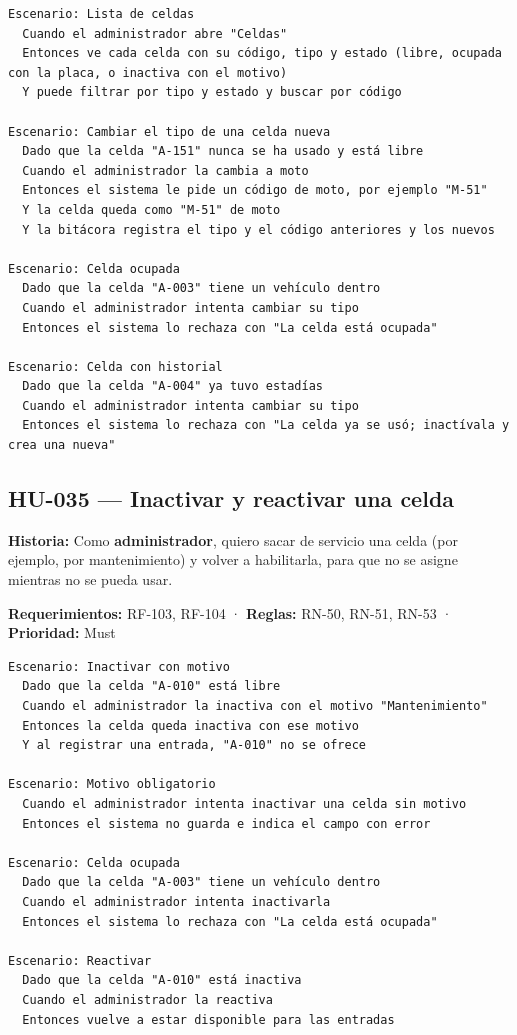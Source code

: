 \begin{lstlisting}[style=gherkin]
Escenario: Lista de celdas
  Cuando el administrador abre "Celdas"
  Entonces ve cada celda con su código, tipo y estado (libre, ocupada con la placa, o inactiva con el motivo)
  Y puede filtrar por tipo y estado y buscar por código

Escenario: Cambiar el tipo de una celda nueva
  Dado que la celda "A-151" nunca se ha usado y está libre
  Cuando el administrador la cambia a moto
  Entonces el sistema le pide un código de moto, por ejemplo "M-51"
  Y la celda queda como "M-51" de moto
  Y la bitácora registra el tipo y el código anteriores y los nuevos

Escenario: Celda ocupada
  Dado que la celda "A-003" tiene un vehículo dentro
  Cuando el administrador intenta cambiar su tipo
  Entonces el sistema lo rechaza con "La celda está ocupada"

Escenario: Celda con historial
  Dado que la celda "A-004" ya tuvo estadías
  Cuando el administrador intenta cambiar su tipo
  Entonces el sistema lo rechaza con "La celda ya se usó; inactívala y crea una nueva"
\end{lstlisting}

\subsection{HU-035 — Inactivar y reactivar una celda}

\textbf{Historia:} Como \textbf{administrador}, quiero sacar de servicio una celda (por ejemplo, por mantenimiento) y volver a habilitarla, para que no se asigne mientras no se pueda usar.


\textbf{Requerimientos:} RF-103, RF-104 · \textbf{Reglas:} RN-50, RN-51, RN-53 · \textbf{Prioridad:} Must


\begin{lstlisting}[style=gherkin]
Escenario: Inactivar con motivo
  Dado que la celda "A-010" está libre
  Cuando el administrador la inactiva con el motivo "Mantenimiento"
  Entonces la celda queda inactiva con ese motivo
  Y al registrar una entrada, "A-010" no se ofrece

Escenario: Motivo obligatorio
  Cuando el administrador intenta inactivar una celda sin motivo
  Entonces el sistema no guarda e indica el campo con error

Escenario: Celda ocupada
  Dado que la celda "A-003" tiene un vehículo dentro
  Cuando el administrador intenta inactivarla
  Entonces el sistema lo rechaza con "La celda está ocupada"

Escenario: Reactivar
  Dado que la celda "A-010" está inactiva
  Cuando el administrador la reactiva
  Entonces vuelve a estar disponible para las entradas
\end{lstlisting}

